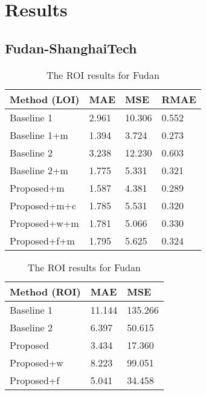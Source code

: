 \chapter{Results}

\section{Fudan-ShanghaiTech}

\begin{table}[!htb]
	\begin{minipage}{.5\linewidth}
      \centering
		\begin{tabular}{llll}
		\hline
		Method (LOI)                               & MAE & MSE & RMAE \\ \hline
		\multicolumn{1}{l|}{Baseline 1}          & 2.961 & 10.306 & 0.552 \\
		\multicolumn{1}{l|}{Baseline 1+m}        & 1.394 & 3.724 & 0.273 \\
		\multicolumn{1}{l|}{Baseline 2}          & 3.238 & 12.230 & 0.603 \\
		\multicolumn{1}{l|}{Baseline 2+m}        & 1.775 & 5.331 & 0.321 \\
		\multicolumn{1}{l|}{Proposed+m}        	 & 1.587 & 4.381 & 0.289 \\
		\multicolumn{1}{l|}{Proposed+m+c}        & 1.785 & 5.531 & 0.320 \\
		\multicolumn{1}{l|}{Proposed+w+m}        & 1.781 & 5.066 & 0.330 \\
		\multicolumn{1}{l|}{Proposed+f+m}        & 1.795 & 5.625 & 0.324 \\ \hline
		\end{tabular}
		\caption{\label{tab:loi_fudan}The LOI results for Fudan}
	\end{minipage}
	\begin{minipage}{.5\linewidth}
      \centering
		\begin{tabular}{lll}
		\hline
		Method (ROI)                               & MAE & MSE \\ \hline
		\multicolumn{1}{l|}{Baseline 1}          & 11.144 & 135.266 \\
		\multicolumn{1}{l|}{Baseline 2}          & 6.397 & 50.615 \\
		\multicolumn{1}{l|}{Proposed}        	 & 3.434 & 17.360 \\
		\multicolumn{1}{l|}{Proposed+w} 		 & 8.223 & 99.051 \\
		\multicolumn{1}{l|}{Proposed+f} 		 & 5.041 & 34.458 \\ \hline
		\end{tabular}
		\caption{\label{tab:roi_fudan}The ROI results for Fudan}
	\end{minipage}
\end{table}


